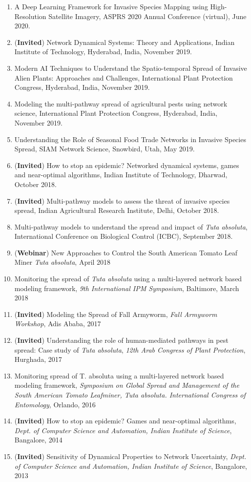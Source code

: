 \documentclass[margin,10pt]{res} %
\begin{document}
\begin{resume}
{\begin{enumerate}[1.]
(virtual), January 2021.
\item A Deep Learning Framework for Invasive Species Mapping using
High-Resolution Satellite Imagery, ASPRS 2020 Annual Conference (virtual), June 2020.
\item (\textbf{Invited}) Network Dynamical Systems: Theory and
Applications, Indian Institute of Technology, Hyderabad, India,
November 2019.
\item Modern AI Techniques to Understand the Spatio-temporal Spread of
Invasive Alien Plants: Approaches and Challenges, International Plant
Protection Congress, Hyderabad, India, November 2019.
\item Modeling the multi-pathway spread of agricultural pests using
network science, International Plant Protection Congress, Hyderabad,
India, November 2019.
\item Understanding the Role of Seasonal Food Trade Networks in Invasive
Species Spread, SIAM Network Science, Snowbird, Utah,
May 2019.
\item (\textbf{Invited}) How to stop an epidemic? Networked dynamical
systems, games and near-optimal algorithms, Indian Institute of
Technology, Dharwad, October 2018.
\item (\textbf{Invited}) Multi-pathway models to assess the threat of
invasive species spread, Indian Agricultural Research Institute, Delhi,
October 2018.
\item Multi-pathway models to understand the spread and impact of
\emph{Tuta
absoluta}, International Conference on Biological Control (ICBC),
September 2018.
\item (\textbf{Webinar}) New Approaches to Control the South American Tomato
Leaf Miner \emph{Tuta absoluta}, April 2018
\item Monitoring the spread of {\it Tuta absoluta} using a
multi-layered network based modeling framework, \emph{9th International
IPM Symposium}, Baltimore, March 2018
    \item (\textbf{Invited}) Modeling the Spread of Fall Armyworm,
    \emph{Fall Armyworm Workshop}, Adis Ababa, 2017
    \item (\textbf{Invited}) Understanding the role of human-mediated
    pathways in pest spread: Case study of \emph{Tuta absoluta}, \emph{12th
    Arab Congress of Plant Protection}, Hurghada, 2017
\item Monitoring spread of T. absoluta using a multi-layered network
based modeling framework, \emph{Symposium on Global Spread and Management
of the South American Tomato Leafminer, Tuta absoluta. International
Congress of Entomology}, Orlando, 2016
\item (\textbf{Invited}) How to stop an epidemic?  Games and near-optimal
algorithms, \emph{Dept. of Computer Science and Automation, Indian
Institute of Science}, Bangalore, 2014
\item (\textbf{Invited}) Sensitivity of Dynamical Properties to Network
Uncertainty, \emph{Dept. of Computer Science and Automation, Indian
Institute of Science}, Bangalore, 2013
\end{enumerate}
}


\end{resume}
\end{document}
